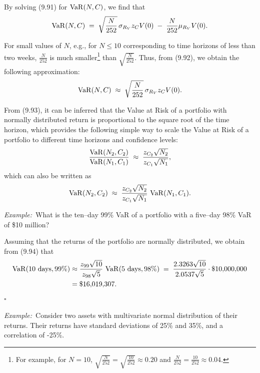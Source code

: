 By solving (9.91) for $\operatorname{VaR}(N,C)$, we find that
\begin{equation}
\operatorname{VaR}(N,C) \;=\; \sqrt{\frac{N}{252}}\,\sigma_{R_V} z_C V(0) \;-\; \frac{N}{252}\mu_{R_V}V(0).
\end{equation}

For small values of $N$, e.g., for $N \le 10$ corresponding to time horizons
of less than two weeks, $\frac{N}{252}$ is much smaller\footnote{For example,
for $N=10$, $\sqrt{\frac{N}{252}} = \sqrt{\frac{10}{252}} \approx 0.20$ and
$\frac{N}{252} = \frac{10}{252} \approx 0.04$.} than $\sqrt{\frac{N}{252}}$.
Thus, from (9.92), we obtain the following approximation:
\begin{equation}
\operatorname{VaR}(N,C) \;\approx\; \sqrt{\frac{N}{252}}\,\sigma_{R_V} z_C V(0).
\end{equation}

From (9.93), it can be inferred that the Value at Risk of a portfolio with
normally distributed return is proportional to the square root of the time
horizon, which provides the following simple way to scale the Value at Risk
of a portfolio to different time horizons and confidence levels:
\[
\frac{\operatorname{VaR}(N_2,C_2)}{\operatorname{VaR}(N_1,C_1)} \;\approx\; \frac{z_{C_2}\sqrt{N_2}}{z_{C_1}\sqrt{N_1}},
\]
which can also be written as
\begin{equation}
\operatorname{VaR}(N_2,C_2) \;\approx\; \frac{z_{C_2}\sqrt{N_2}}{z_{C_1}\sqrt{N_1}}\,\operatorname{VaR}(N_1,C_1).
\end{equation}

\par\medskip\noindent\textit{Example:}\ What is the ten--day 99\% VaR of a
portfolio with a five--day 98\% VaR of \$10 million?

\begin{answerx}
Assuming that the returns of the portfolio are normally distributed, we
obtain from (9.94) that
\[
\begin{aligned}
\operatorname{VaR}(10\text{ days},99\%) &\approx \frac{z_{99}\sqrt{10}}{z_{98}\sqrt{5}}\,\operatorname{VaR}(5\text{ days},98\%) \;=\; \frac{2.3263\sqrt{10}}{2.0537\sqrt{5}}\cdot\$10{,}000{,}000\\
&= \$16{,}019{,}307.
\end{aligned}
\]
\hfill$\square$
\end{answerx}

\par\medskip\noindent\textit{Example:}\ Consider two assets with multivariate
normal distribution of their returns. Their returns have standard deviations
of 25\% and 35\%, and a correlation of -25\%.

